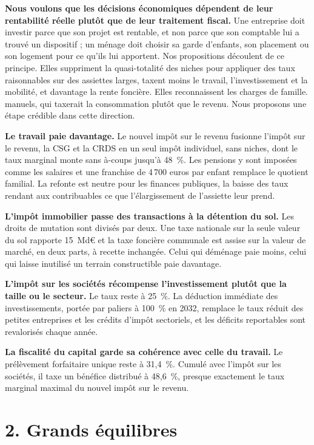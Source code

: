 \textbf{Nous voulons que les décisions économiques dépendent de leur rentabilité réelle plutôt que de leur traitement
fiscal.} Une entreprise doit investir parce que son projet est rentable, et non parce que son comptable lui a trouvé un
dispositif ; un ménage doit choisir sa garde d'enfants, son placement ou son logement pour ce qu'ils lui apportent. Nos
propositions découlent de ce principe. Elles suppriment la quasi-totalité des niches pour appliquer des taux
raisonnables sur des assiettes larges, taxent moins le travail, l'investissement et la mobilité, et davantage la rente
foncière. Elles reconnaissent les charges de famille. %
manuels, qui taxerait la consommation plutôt que le revenu. Nous proposons une étape crédible dans cette direction.

\textbf{Le travail paie davantage.} Le nouvel impôt sur le revenu fusionne l'impôt sur le revenu, la CSG et la CRDS en un
seul impôt individuel, sans niches, dont le taux marginal monte sans à-coups jusqu'à 48~\%. Les pensions y sont imposées
comme les salaires et une franchise de 4\,700 euros par enfant remplace le quotient familial. La refonte est neutre pour
les finances publiques, la baisse des taux rendant aux contribuables ce que l'élargissement de l'assiette leur prend.

\textbf{L'impôt immobilier passe des transactions à la détention du sol.} Les droits de mutation sont divisés par deux.
Une taxe nationale sur la seule valeur du sol rapporte 15~Md€ et la taxe foncière communale est assise sur la valeur de
marché, en deux parts, à recette inchangée. Celui qui déménage paie moins, celui qui laisse inutilisé un terrain
constructible paie davantage.

\textbf{L'impôt sur les sociétés récompense l'investissement plutôt que la taille ou le secteur.} Le taux reste à 25~\%.
La déduction immédiate des investissements, portée par paliers à 100~\% en 2032, remplace le taux réduit des petites
entreprises et les crédits d'impôt sectoriels, et les déficits reportables sont revalorisés chaque année.

\textbf{La fiscalité du capital garde sa cohérence avec celle du travail.} Le prélèvement forfaitaire unique reste à
31,4~\%. Cumulé avec l'impôt sur les sociétés, il taxe un bénéfice distribué à 48,6~\%, presque exactement le taux
marginal maximal du nouvel impôt sur le revenu.

\section{2. Grands équilibres}

